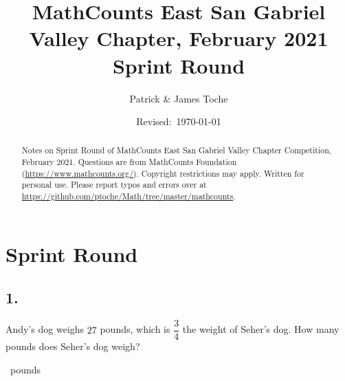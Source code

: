 \documentclass[12pt]{article}
\title{MathCounts East San Gabriel Valley Chapter, February 2021 \\ Sprint Round}
\author{Patrick \& James Toche}
\date{Revised:~\today}
\begin{document}
\maketitle
\begin{minipage}{\textwidth}
\begin{abstract}\setlength{\parindent}{0pt}%
Notes on Sprint Round of MathCounts East San Gabriel Valley Chapter Competition, February 2021. 
Questions are from MathCounts Foundation (\url{https://www.mathcounts.org/}). Copyright restrictions may apply. Written for personal use. 
Please report typos and errors over at \url{https://github.com/ptoche/Math/tree/master/mathcounts}. 
\end{abstract}
\end{minipage}

\thispagestyle{empty}
\clearpage
\addtocounter{page}{-1}

\section*{Sprint Round}


\subsection*{1.}
Andy's dog weighs $27$ pounds, which is $\dfrac{3}{4}$ the weight of Seher's dog. How many pounds does Seher's dog weigh?

\nopagebreak

\fbox{\phantom{ANSWER}}~pounds

\begin{answer}
%
\end{answer}
\end{document}
